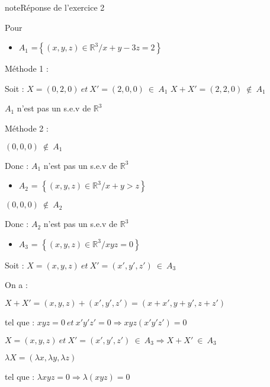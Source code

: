 \documentclass[letterpaper,10pt,french]{jupyterBook}
\begin{document}
\begin{sphinxadmonition}{note}{Réponse de l’exercice 2}

\sphinxAtStartPar
Pour
\begin{itemize}
\item {} 
\sphinxAtStartPar
\(A_1\) =\( \left\{ (x,y,z) \in \mathbb{R}^3 / x+y-3z = 2 \right\}\)

\end{itemize}

\sphinxAtStartPar
Méthode 1 :

\sphinxAtStartPar
Soit :  \(X=(0,2,0) ~ et~ X'= (2,0, 0) ~ \in ~A_1\)
\(X+ X' = (2,2,0)~ \notin ~A_1\)

\sphinxAtStartPar
\(A_1\) n’est pas un s.e.v de \(\mathbb{R}^3\)

\sphinxAtStartPar
Méthode 2 :

\sphinxAtStartPar
\((0,0,0)~ \notin ~A_1\)

\sphinxAtStartPar
Donc : \(A_1\) n’est pas un s.e.v de \(\mathbb{R}^3\)
\begin{itemize}
\item {} 
\sphinxAtStartPar
\(A_2\) =  \(\left\{ (x,y,z) \in \mathbb{R}^3 / x+y > z \right\}\)

\end{itemize}

\sphinxAtStartPar
\((0,0,0)~ \notin ~A_2\)

\sphinxAtStartPar
Donc : \(A_2\) n’est pas un s.e.v de \(\mathbb{R}^3\)
\begin{itemize}
\item {} 
\sphinxAtStartPar
\(A_3\) = \( \left\{ (x,y,z) \in \mathbb{R}^3 / xyz = 0 \right\}\)

\end{itemize}

\sphinxAtStartPar
Soit :  \(X=(x,y,z) ~ et~ X'= (x',y',z') ~ \in ~A_3\)

\sphinxAtStartPar
On a :

\sphinxAtStartPar
\(X+ X' = (x,y,z) + (x',y',z') = (x+x',y+y',z+z')\)

\sphinxAtStartPar
tel que : \(xyz= 0 ~et~ x'y'z' = 0 \Rightarrow xyz(x'y'z') = 0 \)

\sphinxAtStartPar
\(X=(x,y,z) ~ et~ X'= (x',y',z') ~ \in ~A_3 \Rightarrow X+ X'~ \in ~A_3\)

\sphinxAtStartPar
\(\lambda X = (\lambda x, \lambda y,\lambda z)\)

\sphinxAtStartPar
tel que :
\(\lambda xyz = 0 \Rightarrow \lambda (xyz) = 0\)


\end{sphinxadmonition}
\end{document}
